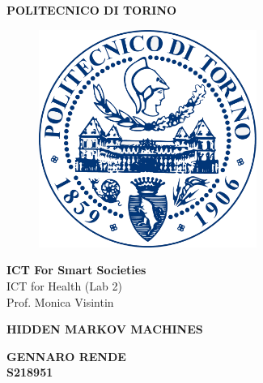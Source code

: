 \documentclass[12pt]{article}
\begin{document}

\begin{center}
\textbf{\Huge POLITECNICO DI TORINO}

\begin{figure}[H]
  \centering
  \includegraphics[width=2.8in]{poli.png}
\end{figure}

\end{center}
\begin{center}
\vspace{0.05in}
\Large{\textbf{ICT For Smart Societies}\\
\vspace{0.08in}
\Large ICT for Health (Lab 2)}\\
\large Prof. Monica Visintin
\end{center}
\begin{center}
\vspace{0.08in}
\end{center}

\vspace{0.8in}
\begin{center}
\textbf{\Huge HIDDEN MARKOV MACHINES}
\end{center}

\vspace{0.75in}
\begin{center}
\vspace{1in}
\textbf{\Large GENNARO RENDE}\\
\textbf{S218951}\\
\end{center}



\pagebreak

\end{document}
